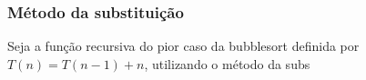 \subsubsection{Método da substituição}
Seja a função recursiva do pior caso da bubblesort definida por $T(n) = T(n-1) + n$, utilizando o método da subs
